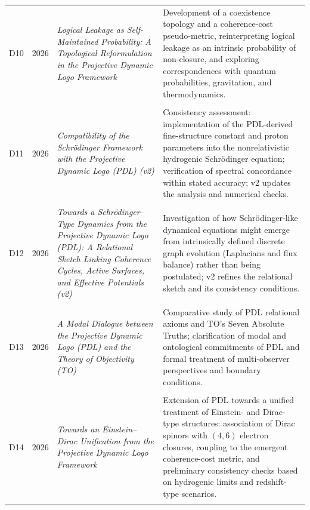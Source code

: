 \documentclass[11pt,a4paper]{article}
\begin{document}
\begin{longtable}{@{}llL{4cm}p{9.5cm}@{}}
D10 & 2026 & \textit{Logical Leakage as Self-Maintained Probability: A Topological Reformulation in the Projective Dynamic Logo Framework} &
Development of a coexistence topology and a coherence-cost pseudo-metric, reinterpreting logical leakage as an intrinsic probability of non-closure, and exploring correspondences with quantum probabilities, gravitation, and thermodynamics. \citep{Topological_Reformulation_PDL_2026} \\\\[0.5em]

D11 & 2026 & \textit{Compatibility of the Schr\"odinger Framework with the Projective Dynamic Logo (PDL) (v2)} &
Consistency assessment: implementation of the PDL-derived fine-structure constant and proton parameters into the nonrelativistic hydrogenic Schr\"odinger equation; verification of spectral concordance within stated accuracy; v2 updates the analysis and numerical checks. \citep{Schrodinger_PDL_v2_2026} \\\\[0.5em]

D12 & 2026 & \textit{Towards a Schr\"odinger--Type Dynamics from the Projective Dynamic Logo (PDL): A Relational Sketch Linking Coherence Cycles, Active Surfaces, and Effective Potentials (v2)} &
Investigation of how Schr\"odinger-like dynamical equations might emerge from intrinsically defined discrete graph evolution (Laplacians and flux balance) rather than being postulated; v2 refines the relational sketch and its consistency conditions. \citep{Schrodinger_Sketch_v2_2026} \\\\[0.5em]

D13 & 2026 & \textit{A Modal Dialogue between the Projective Dynamic Logo (PDL) and the Theory of Objectivity (TO)} &
Comparative study of PDL relational axioms and TO's Seven Absolute Truths; clarification of modal and ontological commitments of PDL and formal treatment of multi-observer perspectives and boundary conditions. \citep{PDL_TO_dialogue} \\\\[0.5em]

D14 & 2026 & \textit{Towards an Einstein--Dirac Unification from the Projective Dynamic Logo Framework} &
Extension of PDL towards a unified treatment of Einstein- and Dirac-type structures: association of Dirac spinors with $(4,6)$ electron closures, coupling to the emergent coherence-cost metric, and preliminary consistency checks based on hydrogenic limits and redshift-type scenarios. \citep{Einstein_Dirac_PDL_2026} \\\\[0.5em]


\end{longtable}
\end{document}
